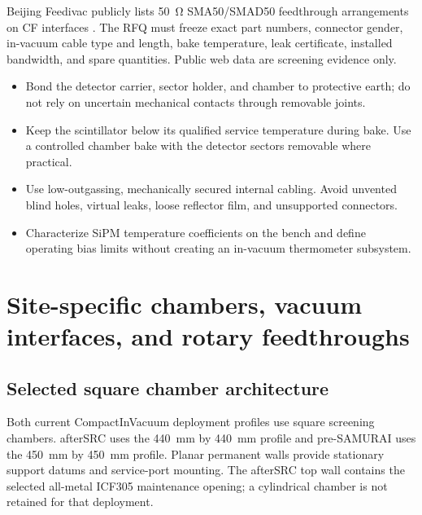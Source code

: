 \documentclass[10pt,letterpaper]{article}
\begin{document}
Beijing Feedivac publicly lists \SI{50}{\ohm} SMA50/SMAD50 feedthrough arrangements on CF
interfaces \cite{feedivac_sma}. The RFQ must freeze exact part numbers, connector gender,
in-vacuum cable type and length, bake temperature, leak certificate, installed bandwidth,
and spare quantities. Public web data are screening evidence only.

\begin{itemize}
  \item Bond the detector carrier, sector holder, and chamber to protective earth; do not
    rely on uncertain mechanical contacts through removable joints.
  \item Keep the scintillator below its qualified service temperature during bake.
    Use a controlled chamber bake with the detector sectors removable where practical.
  \item Use low-outgassing, mechanically secured internal cabling. Avoid unvented blind holes,
    virtual leaks, loose reflector film, and unsupported connectors.
  \item Characterize SiPM temperature coefficients on the bench and define operating bias
    limits without creating an in-vacuum thermometer subsystem.
\end{itemize}

\section{Site-specific chambers, vacuum interfaces, and rotary feedthroughs}

\subsection{Selected square chamber architecture}

Both current CompactInVacuum deployment profiles use square screening chambers. afterSRC
uses the \SI{440}{\milli\meter} by \SI{440}{\milli\meter} profile and pre-SAMURAI uses the
\SI{450}{\milli\meter} by \SI{450}{\milli\meter} profile. Planar permanent walls provide
stationary support datums and service-port mounting. The afterSRC top wall contains the selected
all-metal ICF305 maintenance opening; a cylindrical chamber is not retained for that deployment.
\end{document}
